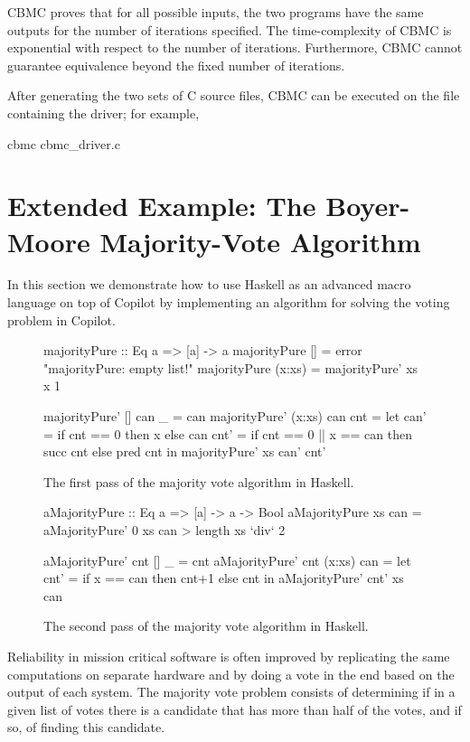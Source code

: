 \documentclass[]{article}
\theoremstyle{example}
\begin{document}
CBMC proves that for all possible inputs, the two programs have the same outputs
for the number of iterations specified.  The time-complexity of CBMC is
exponential with respect to the number of iterations.  Furthermore, CBMC cannot
guarantee equivalence beyond the fixed number of iterations.

After generating the two sets of C source files, CBMC can be executed on the
file containing the driver; for example,
%
\begin{code}
cbmc cbmc_driver.c  
\end{code}
%

\section{Extended Example: The Boyer-Moore Majority-Vote Algorithm}
\label{subsec:boyer_moore}

In this section we demonstrate how to use Haskell as an advanced macro language
on top of Copilot by implementing an algorithm for solving the voting problem
in Copilot.

\begin{figure*}
\begin{code}
majorityPure :: Eq a => [a] -> a
majorityPure []     = error "majorityPure: empty list!"
majorityPure (x:xs) = majorityPure' xs x 1

majorityPure' []     can _   = can
majorityPure' (x:xs) can cnt =
  let
    can' = if cnt == 0 then x else can
    cnt' = if cnt == 0 || x == can then succ cnt else pred cnt
  in
    majorityPure' xs can' cnt'
\end{code}
\caption{The first pass of the majority vote algorithm in Haskell.}
\label{fig:majority_pure}
\end{figure*}

\begin{figure*}
\begin{code}
aMajorityPure :: Eq a => [a] -> a -> Bool
aMajorityPure xs can = aMajorityPure' 0 xs can > length xs `div` 2

aMajorityPure' cnt []     _   = cnt
aMajorityPure' cnt (x:xs) can =
  let
    cnt' = if x == can then cnt+1 else cnt
  in
    aMajorityPure' cnt' xs can
\end{code}
\caption{The second pass of the majority vote algorithm in Haskell.}
\label{fig:amajority_pure}
\end{figure*}

Reliability in mission critical software is often improved by replicating
the same computations on separate hardware and by doing a vote in the end
based on the output of each system. The majority vote problem consists of
determining if in a given list of votes there is a candidate that has more
than half of the votes, and if so, of finding this candidate.
\end{document}

